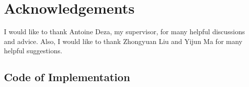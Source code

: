 \documentclass[11pt]{article}
\begin{document}
\section{Acknowledgements}
I would like to thank Antoine Deza, my supervisor, for many helpful discussions and advice. Also, I would like to thank Zhongyuan Liu and Yijun Ma for many helpful suggestions.

\newpage




\newpage
\appendix
\subsection*{Code of Implementation}
\\
\\
\\
\\
\end{document}
